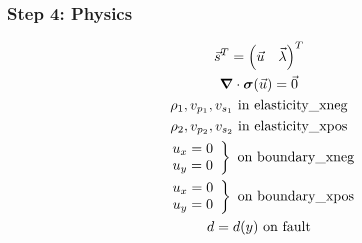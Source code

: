 \documentclass[aspectratio=169]{beamer}
\begin{document}
\begin{frame}
  \frametitle{Step 4: Physics}
  \summary{}

  \begin{minipage}{0.35\textwidth}
    {\scriptsize
    \begin{gather*}
    \vec{s}^T = \left( \vec{u} \quad \vec{\lambda} \right)^T \\
    \bm{\nabla} \cdot \bm{\sigma}(\vec{u}) = \vec{0} \\
    \rho_1, v_{p_1}, v_{s_1} \text{ in elasticity\_xneg} \\ 
    \rho_2, v_{p_2}, v_{s_2} \text{ in elasticity\_xpos} \\ 
    \left. \begin{array}{c} u_x = 0 \\ u_y = 0 \end{array}\right\} \text{ on boundary\_xneg} \\
    \left. \begin{array}{c} u_x = 0 \\ u_y = 0 \end{array}\right\} \text{ on boundary\_xpos} \\
    d = d(y) \text{ on fault}
    \end{gather*}}
  \end{minipage}
  \hfill
  \begin{minipage}{0.60\textwidth}
  \end{minipage}
      
\end{frame}
\end{document}

